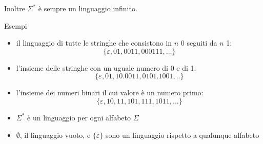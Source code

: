 Inoltre $\Sigma^*$ è sempre un linguaggio infinito.

Esempi

				\begin{itemize}
					\item il linguaggio di tutte le stringhe che consistono in $n$ 0 seguiti da $n$ 1:
								$$\{\varepsilon,01,0011,000111,...\}$$
					\item l'insieme delle stringhe con un uguale numero di 0 e di 1:
								$$\{\varepsilon,01,10.0011,0101.1001,..\}$$
					\item l'insieme dei numeri binari il cui valore è un numero primo:
								$$\{\varepsilon,10 , 11, 101, 111,1011,...\}$$
					\item $\Sigma^*$ è un linguaggio per ogni alfabeto $\Sigma$
					\item $\emptyset$, il linguaggio vuoto, e $\{\varepsilon\}$ sono un linguaggio rispetto a qualunque alfabeto
				\end{itemize}

